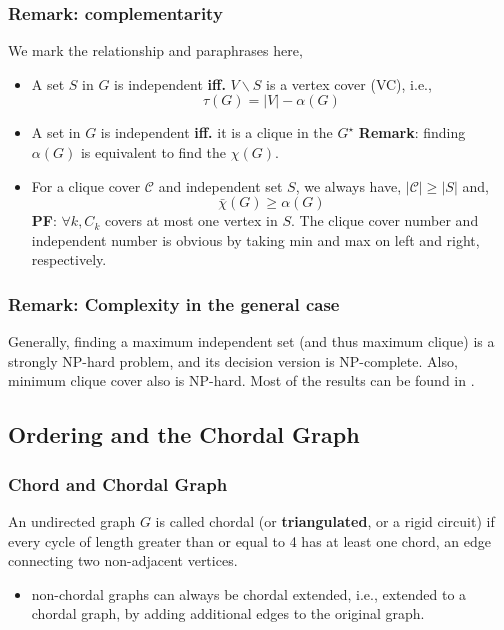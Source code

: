 \subsubsection*{Remark: complementarity}
We mark the relationship and paraphrases here,
\begin{itemize}
      \item A set \(S\) in \(G\) is independent \textbf{iff.} \(V\backslash S\) is a vertex cover (VC), i.e.,
            \[\tau(G) = |V| - \alpha(G)\]
      \item A set in \(G\) is independent \textbf{iff.} it is a clique in the \(G^\star\)
            \textbf{Remark}: finding \(\alpha(G)\) is equivalent to find the \(\chi(G)\).
      \item For a clique cover \(\mathscr C\) and independent set \(S\), we always have, \(|\mathscr C| \ge |S|\) and,
            \[\bar \chi (G) \ge \alpha(G)\]
            \textbf{PF}: \(\forall k, C_k \) covers at most one vertex in \(S\). The clique cover number and independent number is obvious by taking min and max on left and right, respectively.
\end{itemize}

\subsubsection*{Remark: Complexity in the general case}

Generally, finding a maximum independent set (and thus maximum clique) is a strongly NP-hard problem, and its decision version is NP-complete. Also, minimum clique cover also is NP-hard. Most of the results can be found in \cite{schrijver_combinatorial_2003}.


\subsection{Ordering and the Chordal Graph}

\subsubsection*{Chord and Chordal Graph}

An undirected graph \(G\) is called chordal (or \textbf{triangulated}, or a rigid circuit) if every cycle of
length greater than or equal to 4 has at least one chord, an edge connecting two non-adjacent vertices.

\begin{itemize}
      \tightlist
      \item non-chordal graphs can always be chordal extended, i.e., extended to a chordal graph, by adding additional edges to the original graph.
\end{itemize}

